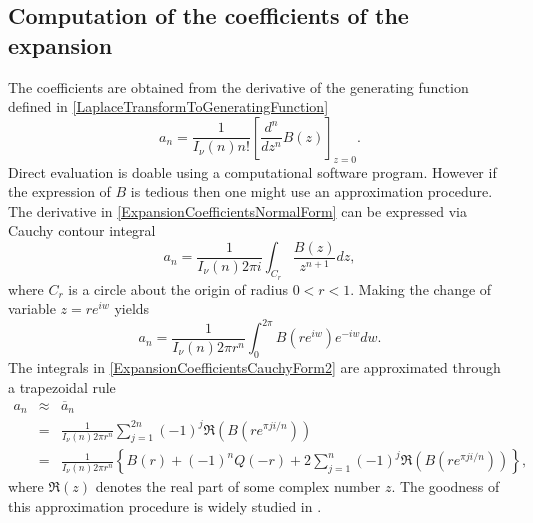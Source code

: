 \subsection{Computation of the coefficients of the expansion}
The coefficients are obtained from the derivative of the generating function defined in \eqref{LaplaceTransformToGeneratingFunction}
\begin{equation}\label{ExpansionCoefficientsNormalForm}
a_{n}=\frac{1}{I_{\nu}(n)n!}\left[\frac{d^{n}}{dz^{n}}B(z)\right]_{z=0}.
\end{equation}
Direct evaluation is doable using a computational software program. However if the expression of $B$ is tedious then one might use an approximation procedure. The derivative in \eqref{ExpansionCoefficientsNormalForm} can be expressed via Cauchy contour integral
\begin{equation}\label{ExpansionCoefficientsCauchyForm1}
a_{n}=\frac{1}{I_{\nu}(n)2\pi i}\int_{C_{r}}\frac{B(z)}{z^{n+1}}dz,
\end{equation}
where $C_{r}$ is a circle about the origin of radius $0<r<1$. Making the change of variable $z=re^{iw}$ yields
\begin{equation}\label{ExpansionCoefficientsCauchyForm2}
a_{n}=\frac{1}{I_{\nu}(n)2\pi r^{n}}\int_{0}^{2\pi}B(re^{iw})e^{-iw}dw.
\end{equation}
The integrals in \eqref{ExpansionCoefficientsCauchyForm2} are approximated through a trapezoidal rule
\begin{eqnarray*}
a_{n}&\approx&\overline{a}_{n}\\
&=&\frac{1}{I_{\nu}(n)2\pi r^{n}}\sum_{j=1}^{2n}(-1)^{j}\Re(B(re^{\pi ji/n}))\\
&=&\frac{1}{I_{\nu}(n)2\pi r^{n}}\left\{B(r)+(-1)^{n}Q(-r)+2\sum_{j=1}^{n}(-1)^{j}\Re(B(re^{\pi ji/n}))\right\},
\end{eqnarray*}
where $\Re(z)$ denotes the real part of some complex number $z$. The goodness of this approximation procedure is widely studied in \citet{AbChWh95}.
